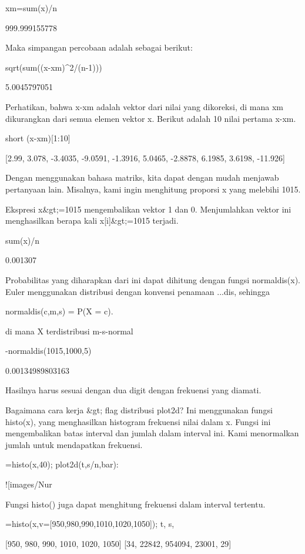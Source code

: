 \documentclass{article}
\begin{document}
\>xm=sum(x)/n


    999.999155778

Maka simpangan percobaan adalah sebagai berikut:


\>sqrt(sum((x-xm)^2/(n-1)))


    5.0045797051

Perhatikan, bahwa x-xm adalah vektor dari nilai yang dikoreksi, di
mana xm dikurangkan dari semua elemen vektor x. Berikut adalah 10
nilai pertama x-xm.


\>short (x-xm)[1:10]


    [2.99,  3.078,  -3.4035,  -9.0591,  -1.3916,  5.0465,  -2.8878,
    6.1985,  3.6198,  -11.926]

Dengan menggunakan bahasa matriks, kita dapat dengan mudah menjawab
pertanyaan lain. Misalnya, kami ingin menghitung proporsi x yang
melebihi 1015.


Ekspresi x&gt;=1015 mengembalikan vektor 1 dan 0. Menjumlahkan vektor ini
menghasilkan berapa kali x[i]&gt;=1015 terjadi.


\>sum(x)/n


    0.001307

Probabilitas yang diharapkan dari ini dapat dihitung dengan fungsi
normaldis(x). Euler menggunakan distribusi dengan konvensi penamaan
...dis, sehingga


normaldis(c,m,s) = P(X = c).


di mana X terdistribusi m-s-normal


-normaldis(1015,1000,5)


    0.00134989803163

Hasilnya harus sesuai dengan dua digit dengan frekuensi yang diamati.


Bagaimana cara kerja &gt; flag distribusi plot2d? Ini menggunakan fungsi
histo(x), yang menghasilkan histogram frekuensi nilai dalam x. Fungsi
ini mengembalikan batas interval dan jumlah dalam interval ini. Kami
menormalkan jumlah untuk mendapatkan frekuensi.


=histo(x,40); plot2d(t,s/n,\>bar):


![images/Nur%

Fungsi histo() juga dapat menghitung frekuensi dalam interval
tertentu.


=histo(x,v=[950,980,990,1010,1020,1050]); t, s,


    [950,  980,  990,  1010,  1020,  1050]
    [34,  22842,  954094,  23001,  29]
\end{document}
